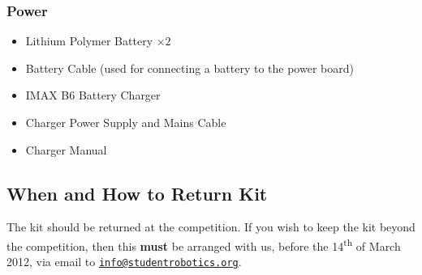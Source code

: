 \subsubsection {Power}

\begin{itemize}
 \item Lithium Polymer Battery $\times 2$
 \item Battery Cable (used for connecting a battery to the power board)
 \item IMAX B6 Battery Charger
 \item Charger Power Supply and Mains Cable
 \item Charger Manual
\end{itemize}

\subsection {When and How to Return Kit}

The kit should be returned at the competition.
If you wish to keep the kit beyond the competition, then this \textbf{must} be arranged with us,
 before the 14\textsuperscript{th} of March 2012, via email to \href{mailto:info@studentrobotics.org}{\nolinkurl{info@studentrobotics.org}}.
